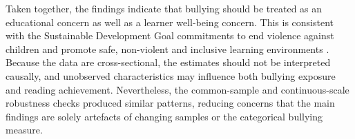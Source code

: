Taken together, the findings indicate that bullying should be treated as an educational concern as well as a learner well-being concern. This is consistent with the Sustainable Development Goal commitments to end violence against children and promote safe, non-violent and inclusive learning environments \citep{FRY20186}. Because the data are cross-sectional, the estimates should not be interpreted causally, and unobserved characteristics may influence both bullying exposure and reading achievement. Nevertheless, the common-sample and continuous-scale robustness checks produced similar patterns, reducing concerns that the main findings are solely artefacts of changing samples or the categorical bullying measure.
